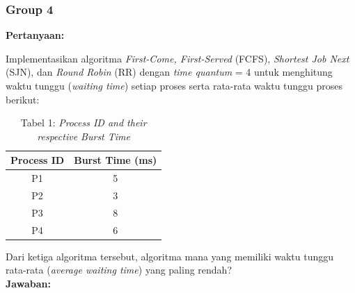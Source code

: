 \documentclass[12pt]{article}
\begin{document}
        \subsubsection{Group 4}
        \textbf{Pertanyaan: }

        Implementasikan algoritma \textit{First-Come, First-Served} (FCFS), \textit{Shortest Job Next} (SJN), dan \textit{Round Robin} (RR) dengan \textit{time quantum} = 4 untuk menghitung waktu tunggu (\textit{waiting time}) setiap proses serta rata-rata waktu tunggu proses berikut:
        \begin{table}[htbp] %
            \centering
            \begin{tabular}{|c|c|} %
            \hline
            \textbf{Process ID} & \textbf{Burst Time (ms)} \\ 
            \hline
            P1 & 5 \\ 
            \hline
            P2 & 3 \\
            \hline
            P3 & 8 \\
            \hline
            P4 & 6 \\ 
            \hline
            \end{tabular}
                        \caption{Tabel 1: \textit{Process ID and their respective Burst Time}}
            \label{tab:process_burst_time} 
        \end{table}

        \noindent Dari ketiga algoritma tersebut, algoritma mana yang memiliki waktu tunggu rata-rata (\textit{average waiting time}) yang paling rendah?\\

        \noindent \textbf{Jawaban: }
\end{document}
